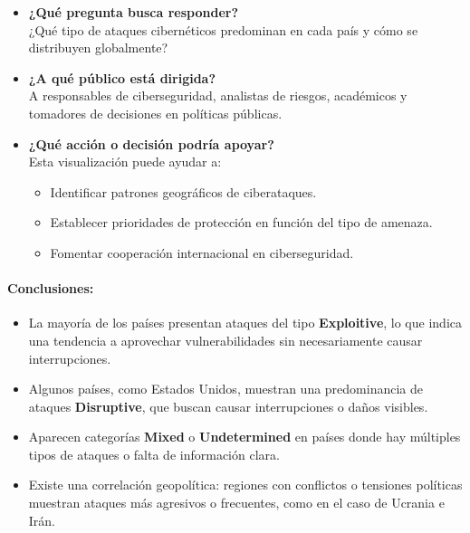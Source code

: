 \documentclass[12pt, a4paper]{article}
\begin{document}
\begin{itemize}
    \item \textbf{¿Qué pregunta busca responder?} \\
    ¿Qué tipo de ataques cibernéticos predominan en cada país y cómo se distribuyen globalmente?

    \item \textbf{¿A qué público está dirigida?} \\
    A responsables de ciberseguridad, analistas de riesgos, académicos y tomadores de decisiones en políticas públicas.

    \item \textbf{¿Qué acción o decisión podría apoyar?} \\
    Esta visualización puede ayudar a:
    \begin{itemize}
        \item Identificar patrones geográficos de ciberataques.
        \item Establecer prioridades de protección en función del tipo de amenaza.
        \item Fomentar cooperación internacional en ciberseguridad.
    \end{itemize}
\end{itemize}

\paragraph{Conclusiones:}
\begin{itemize}
    \item La mayoría de los países presentan ataques del tipo \textbf{Exploitive}, lo que indica una tendencia a aprovechar vulnerabilidades sin necesariamente causar interrupciones.
    \item Algunos países, como Estados Unidos, muestran una predominancia de ataques \textbf{Disruptive}, que buscan causar interrupciones o daños visibles.
    \item Aparecen categorías \textbf{Mixed} o \textbf{Undetermined} en países donde hay múltiples tipos de ataques o falta de información clara.
    \item Existe una correlación geopolítica: regiones con conflictos o tensiones políticas muestran ataques más agresivos o frecuentes, como en el caso de Ucrania e Irán.
\end{itemize}
\end{document}
